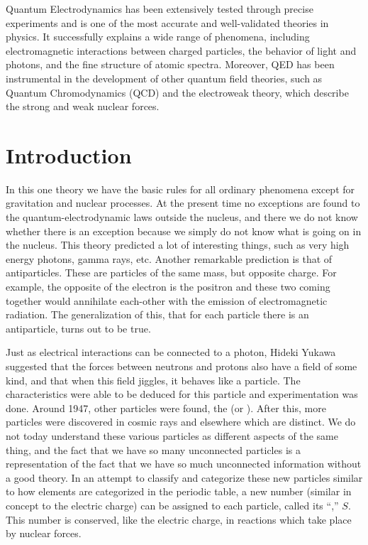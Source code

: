 Quantum Electrodynamics has been extensively tested through precise experiments and is one of the most accurate and well-validated theories in physics. It successfully explains a wide range of phenomena, including electromagnetic interactions between charged particles, the behavior of light and photons, and the fine structure of atomic spectra. Moreover, QED has been instrumental in the development of other quantum field theories, such as Quantum Chromodynamics (QCD) and the electroweak theory, which describe the strong and weak nuclear forces.


\section{Introduction}

In this one theory we have the basic rules for all ordinary phenomena except for gravitation and nuclear processes. At the present time no exceptions are found to the quantum-electrodynamic laws outside the nucleus, and there we do not know whether there is an exception because we simply do not know what is going on in the nucleus. This theory predicted a lot of interesting things, such as very high energy photons, gamma rays, etc. Another remarkable prediction is that of antiparticles. These are particles of the same mass, but opposite charge. For example,  the opposite of the electron is the positron and these two coming together would annihilate each-other with the emission of electromagnetic radiation. The generalization of this, that for each particle there is an antiparticle, turns out to be true.

Just as electrical interactions can be connected to a photon, Hideki Yukawa suggested that the forces between neutrons and protons also have a field of some kind, and that when this field jiggles, it behaves like a particle. The characteristics were able to be deduced for this particle and experimentation was done. Around 1947, other particles were found, the  (or ). After this, more particles were discovered in cosmic rays and elsewhere which are distinct. We do not today understand these various particles as different aspects of the same thing, and the fact that we have so many unconnected particles is a representation of the fact that we have so much unconnected information without a good theory. In an attempt to classify and categorize these new particles similar to how elements are categorized in the periodic table, a new number (similar in concept to the electric charge) can be assigned to each particle, called its ``,'' $S$. This number is conserved, like the electric charge, in reactions which take place by nuclear forces. 


